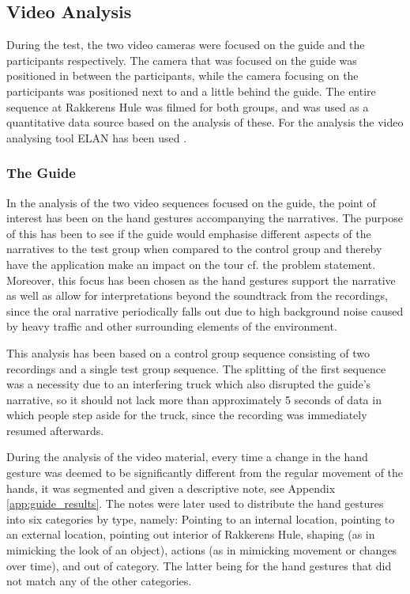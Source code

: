 \subsection{Video Analysis}
During the test, the two video cameras were focused on the guide and the participants respectively. The camera that was focused on the guide was positioned in between the participants, while the camera focusing on the participants was positioned next to and a little behind the guide. The entire sequence at Rakkerens Hule was filmed for both groups, and was used as a quantitative data source based on the analysis of these. For the analysis the video analysing tool ELAN has been used \cite{ELAN}. 

\subsubsection{The Guide}
In the analysis of the two video sequences focused on the guide, the point of interest has been on the hand gestures accompanying the narratives. The purpose of this has been to see if the guide would emphasise different aspects of the narratives to the test group when compared to the control group and thereby have the application make an impact on the tour cf. the problem statement. Moreover, this focus has been chosen as the hand gestures support the narrative as well as allow for interpretations beyond the soundtrack from the recordings, since the oral narrative periodically falls out due to high background noise caused by heavy traffic and other surrounding elements of the environment.

This analysis has been based on a control group sequence consisting of two recordings and a single test group sequence. The splitting of the first sequence was a necessity due to an interfering truck which also disrupted the guide’s narrative, so it should not lack more than approximately 5 seconds of data in which people step aside for the truck, since the recording was immediately resumed afterwards.

During the analysis of the video material, every time a change in the hand gesture was deemed to be significantly different from the regular movement of the hands, it was segmented and given a descriptive note, see Appendix \ref{app:guide_results}. The notes were later used to distribute the hand gestures into six categories by type, namely: Pointing to an internal location, pointing to an external location, pointing out interior of Rakkerens Hule, shaping (as in mimicking the look of an object), actions (as in mimicking movement or changes over time), and out of category. The latter being for the hand gestures that did not match any of the other categories.

